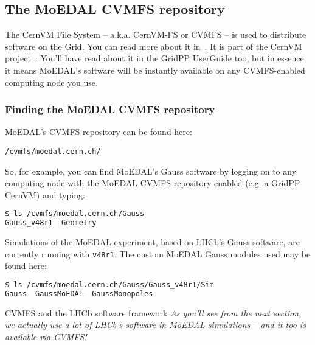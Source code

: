 \subsection{The MoEDAL CVMFS repository}
\label{sec:cvmfs}
The CernVM File System -- a.k.a. CernVM-FS or \acs{CVMFS} -- is used to
distribute software on the Grid.  You can read more about it
in~\cite{CVMFS2015}.  It is part of the CernVM project~\cite{CernVM2015}.
You'll have read about it in the GridPP UserGuide too, but in essence it means
\ac{MoEDAL}'s software will be instantly available on any
\ac{CVMFS}-enabled computing node you use.

\subsubsection{Finding the MoEDAL CVMFS repository}
\label{sec:moedalcvmfsfinding}

MoEDAL's \ac{CVMFS} repository can be found here:

\texttt{/cvmfs/moedal.cern.ch/}

So, for example, you can find MoEDAL's Gauss software by logging on to
any computing node with the MoEDAL \ac{CVMFS} repository enabled
(e.g. a GridPP CernVM) and typing:

\begin{lstlisting}[gobble=0,numbers=none,language=bash]
$ ls /cvmfs/moedal.cern.ch/Gauss
Gauss_v48r1  Geometry
\end{lstlisting}

Simulations of the MoEDAL experiment, based on \acs{LHCb}'s Gauss
software, are currently running with \texttt{v48r1}.
The custom MoEDAL Gauss modules used may be found here:

\begin{lstlisting}[gobble=0,numbers=none,language=bash]
$ ls /cvmfs/moedal.cern.ch/Gauss/Gauss_v48r1/Sim
Gauss  GaussMoEDAL  GaussMonopoles
\end{lstlisting}

\begin{infobox}{CVMFS and the LHCb software framework}
\emph{As you'll see from the next section, we actually use a lot
of \ac{LHCb}'s software in \ac{MoEDAL} simulations -- and it too
is available via \ac{CVMFS}!}
\end{infobox}

